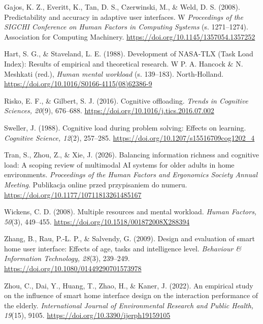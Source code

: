 \documentclass[11pt,a4paper]{article}
\begin{document}
Gajos, K. Z., Everitt, K., Tan, D. S., Czerwinski, M., \& Weld, D. S. (2008). Predictability and accuracy in adaptive user interfaces. W \textit{Proceedings of the SIGCHI Conference on Human Factors in Computing Systems} (s. 1271--1274). Association for Computing Machinery. \url{https://doi.org/10.1145/1357054.1357252}

Hart, S. G., \& Staveland, L. E. (1988). Development of NASA-TLX (Task Load Index): Results of empirical and theoretical research. W P. A. Hancock \& N. Meshkati (red.), \textit{Human mental workload} (s. 139--183). North-Holland. \url{https://doi.org/10.1016/S0166-4115(08)62386-9}

Risko, E. F., \& Gilbert, S. J. (2016). Cognitive offloading. \textit{Trends in Cognitive Sciences, 20}(9), 676--688. \url{https://doi.org/10.1016/j.tics.2016.07.002}

Sweller, J. (1988). Cognitive load during problem solving: Effects on learning. \textit{Cognitive Science, 12}(2), 257--285. \url{https://doi.org/10.1207/s15516709cog1202_4}

Tran, S., Zhou, Z., \& Xie, J. (2026). Balancing information richness and cognitive load: A scoping review of multimodal AI systems for older adults in home environments. \textit{Proceedings of the Human Factors and Ergonomics Society Annual Meeting}. Publikacja online przed przypisaniem do numeru. \url{https://doi.org/10.1177/10711813261485167}

Wickens, C. D. (2008). Multiple resources and mental workload. \textit{Human Factors, 50}(3), 449--455. \url{https://doi.org/10.1518/001872008X288394}

Zhang, B., Rau, P.-L. P., \& Salvendy, G. (2009). Design and evaluation of smart home user interface: Effects of age, tasks and intelligence level. \textit{Behaviour \& Information Technology, 28}(3), 239--249. \url{https://doi.org/10.1080/01449290701573978}

Zhou, C., Dai, Y., Huang, T., Zhao, H., \& Kaner, J. (2022). An empirical study on the influence of smart home interface design on the interaction performance of the elderly. \textit{International Journal of Environmental Research and Public Health, 19}(15), 9105. \url{https://doi.org/10.3390/ijerph19159105}
\end{document}

